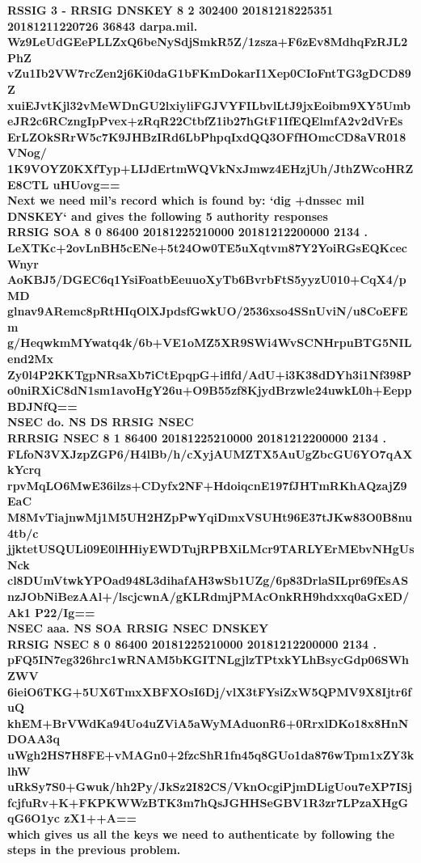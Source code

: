 \documentclass[12pt]{article}
\begin{document}
\begin{enumerate}
  \textbf{RSSIG 3 - RRSIG	DNSKEY 8 2 302400 20181218225351 20181211220726 36843 darpa.mil. Wz9LeUdGEePLLZxQ6beNySdjSmkR5Z/1zsza+F6zEv8MdhqFzRJL2PhZ vZu1Ib2VW7rcZen2j6Ki0daG1bFKmDokarI1Xep0CIoFntTG3gDCD89Z xuiEJvtKjl32vMeWDnGU2lxiyliFGJVYFILbvlLtJ9jxEoibm9XY5Umb eJR2c6RCzngIpPvex+zRqR22CtbfZ1ib27hGtF1IfEQElmfA2v2dVrEs ErLZOkSRrW5c7K9JHBzIRd6LbPhpqIxdQQ3OFfHOmcCD8aVR018VNog/ 1K9VOYZ0KXfTyp+LIJdErtmWQVkNxJmwz4EHzjUh/JthZWcoHRZE8CTL uHUovg==} \\

  \textbf{Next we need mil's record which is found by: `dig +dnssec mil DNSKEY` and gives the following 5 authority responses} \\

  \textbf{RRSIG	SOA 8 0 86400 20181225210000 20181212200000 2134 . LeXTKc+2ovLnBH5cENe+5t24Ow0TE5uXqtvm87Y2YoiRGsEQKcecWnyr AoKBJ5/DGEC6q1YsiFoatbEeuuoXyTb6BvrbFtS5yyzU010+CqX4/pMD glnav9ARemc8pRtHIqOlXJpdsfGwkUO/2536xso4SSnUviN/u8CoEFEm g/HeqwkmMYwatq4k/6b+VE1oMZ5XR9SWi4WvSCNHrpuBTG5NILend2Mx Zy0l4P2KKTgpNRsaXb7iCtEpqpG+iflfd/AdU+i3K38dDYh3i1Nf398P o0niRXiC8dN1sm1avoHgY26u+O9B55zf8KjydBrzwle24uwkL0h+Eepp BDJNfQ==} \\

  \textbf{NSEC	do. NS DS RRSIG NSEC} \\

  \textbf{RRRSIG	NSEC 8 1 86400 20181225210000 20181212200000 2134 . FLfoN3VXJzpZGP6/H4lBb/h/cXyjAUMZTX5AuUgZbcGU6YO7qAXkYcrq rpvMqLO6MwE36ilzs+CDyfx2NF+HdoiqcnE197fJHTmRKhAQzajZ9EaC M8MvTiajnwMj1M5UH2HZpPwYqiDmxVSUHt96E37tJKw83O0B8nu4tb/c jjktetUSQULi09E0lHHiyEWDTujRPBXiLMcr9TARLYErMEbvNHgUsNck cl8DUmVtwkYPOad948L3dihafAH3wSb1UZg/6p83DrlaSILpr69fEsAS nzJObNiBezAAl+/lscjcwnA/gKLRdmjPMAcOnkRH9hdxxq0aGxED/Ak1 P22/Ig==} \\

  \textbf{NSEC	aaa. NS SOA RRSIG NSEC DNSKEY} \\

  \textbf{	RRSIG	NSEC 8 0 86400 20181225210000 20181212200000 2134 . pFQ5IN7eg326hrc1wRNAM5bKGITNLgjlzTPtxkYLhBsycGdp06SWhZWV 6ieiO6TKG+5UX6TmxXBFXOsI6Dj/vlX3tFYsiZxW5QPMV9X8Ijtr6fuQ khEM+BrVWdKa94Uo4uZViA5aWyMAduonR6+0RrxlDKo18x8HnNDOAA3q uWgh2HS7H8FE+vMAGn0+2fzcShR1fn45q8GUo1da876wTpm1xZY3klhW uRkSy7S0+Gwuk/hh2Py/JkSz2I82CS/VknOcgiPjmDLigUou7eXP7ISj fcjfuRv+K+FKPKWWzBTK3m7hQsJGHHSeGBV1R3zr7LPzaXHgGqG6O1yc zX1++A==} \\

  \textbf{which gives us all the keys we need to authenticate by following the steps in the previous problem.}


\end{enumerate}
\end{document}
